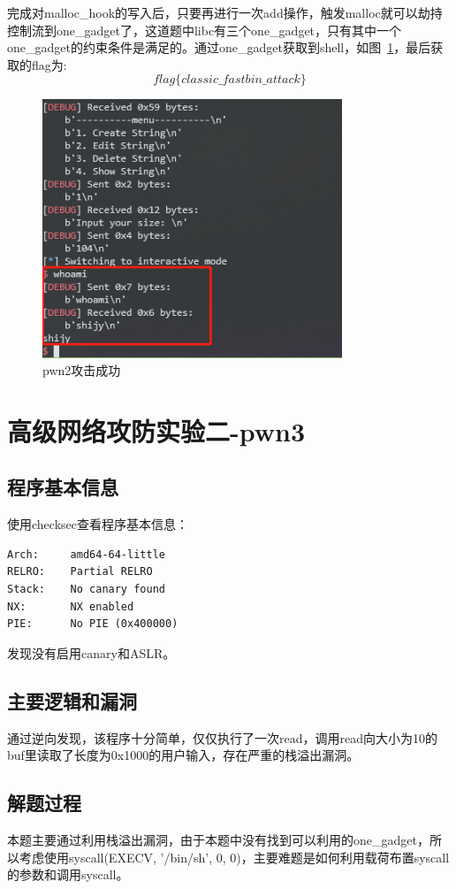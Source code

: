 完成对malloc\_hook的写入后，只要再进行一次add操作，触发malloc就可以劫持控制流到one\_gadget了，这道题中libc有三个one\_gadget，只有其中一个one\_gadget的约束条件是满足的。通过one\_gadget获取到shell，如图~\ref{fig:5}，最后获取的flag为:
$$ flag\{classic\_fastbin\_attack\} $$
\begin{figure}[H]
    \centering
    \includegraphics[width=0.8\textwidth]{WP/pwn/pic/5.jpg}
    \caption{pwn2攻击成功}
    \label{fig:5}
\end{figure}


\section{高级网络攻防实验二-pwn3}
\subsection{程序基本信息}
使用checksec查看程序基本信息：
\begin{lstlisting}
Arch:     amd64-64-little
RELRO:    Partial RELRO
Stack:    No canary found
NX:       NX enabled
PIE:      No PIE (0x400000)
\end{lstlisting}
发现没有启用canary和ASLR。

\subsection{主要逻辑和漏洞}
通过逆向发现，该程序十分简单，仅仅执行了一次read，调用read向大小为10的buf里读取了长度为0x1000的用户输入，存在严重的栈溢出漏洞。

\subsection{解题过程}
本题主要通过利用栈溢出漏洞，由于本题中没有找到可以利用的one\_gadget，所以考虑使用syscall(EXECV, '/bin/sh', 0, 0)，主要难题是如何利用载荷布置syscall的参数和调用syscall。

